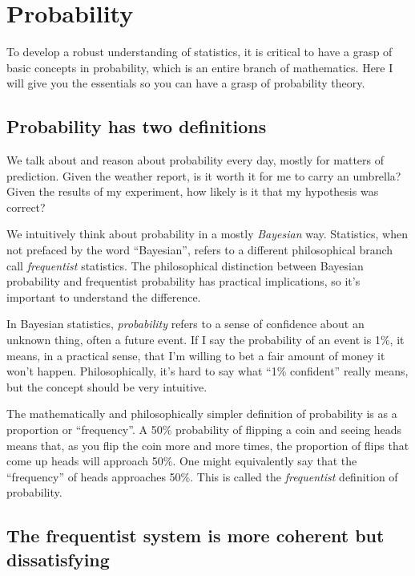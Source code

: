 
\chapter{Probability}
\label{chapter:probability}

To develop a robust understanding of statistics, it is critical to have a grasp
of basic concepts in
probability, which is an entire branch of mathematics. Here I will give you
the essentials so you can have a grasp of probability theory.

\section{Probability has two definitions}

We talk about and reason about probability every day, mostly for matters of
prediction. Given the weather report, is it worth it for me to carry an
umbrella? Given the results of my experiment, how likely is it that my
hypothesis was correct?

We intuitively think about probability in a mostly \emph{Bayesian} way.
Statistics, when not prefaced by the word ``Bayesian'', refers to a different
philosophical branch call \emph{frequentist} statistics. The philosophical
distinction between Bayesian probability and frequentist probability has
practical implications, so it's important to understand the difference.

In Bayesian statistics, \emph{probability} refers to a sense of confidence
about an unknown thing, often a future event. If I say the probability of an
event is 1\%, it means, in a practical sense, that I'm willing to bet a fair
amount of money it won't happen. Philosophically, it's hard to say what ``1\%
confident'' really means, but the concept should be very intuitive.

The mathematically and philosophically simpler definition of probability is as
a proportion or ``frequency''. A 50\% probability of flipping a coin and seeing
heads means that, as you flip the coin more and more times, the proportion of
flips that come up heads will approach 50\%. One might equivalently say that
the ``frequency'' of heads approaches 50\%. This is called the
\emph{frequentist} definition of probability.


\section{The frequentist system is more coherent but dissatisfying}

